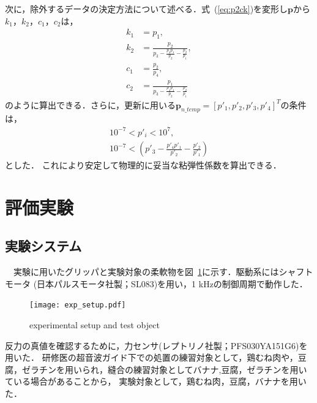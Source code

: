 \documentclass[a4paper]{jarticle}
\begin{document}
次に，除外するデータの決定方法について述べる．式~(\ref{eq:p2ck})を変形し$\mathbf{p}$から$k_1$，$k_2$，$c_1$，$c_2$は，
\begin{equation}
    \begin{aligned}
        k_1 &= p_1 ,\\
        k_2 &= \frac{p_2}{p_3 - \frac{p_4 p_1}{p_2} - \frac{p_2}{p_1}} ,\\
        c_1 &= \frac{p_2}{p_4},\\
        c_2 &= \frac{p_1}{p_3 - \frac{p_4 p_1}{p_2} - \frac{p_2}{p_1}} 
    \end{aligned}
\end{equation}
のように算出できる．さらに，更新に用いる$\mathbf{p}_{n\_temp}=[p'_1,p'_2,p'_3,p'_4]^{T}$の条件は，
\begin{equation}
    \begin{aligned}
        10^{-7} < {p}'_{i} < 10^{7} ,\\
        10^{-7} < \left( p'_3 - \frac{p'_4 p'_1}{p'_2} - \frac{p'_2}{p'_1} \right)
    \end{aligned}
\end{equation}
とした．
これにより安定して物理的に妥当な粘弾性係数を算出できる．
\section{評価実験}
\subsection{実験システム}
　実験に用いたグリッパと実験対象の柔軟物を図~\ref{fig:exp_setup}に示す．駆動系にはシャフトモータ (日本パルスモータ社製；SL083)を用い，1 kHzの制御周期で動作した．
\begin{figure}[tb]
    \centering
    \texttt{[image: exp\_setup.pdf]}
    \caption{experimental setup and test object}
    \label{fig:exp_setup}
\end{figure}
反力の真値を確認するために，力センサ(レプトリノ社製；PFS030YA151G6)を用いた．
研修医の超音波ガイド下での処置の練習対象として，鶏むね肉や，豆腐，ゼラチンを用いられ，縫合の練習対象としてバナナ,豆腐，ゼラチンを用いている場合があることから\cite{exp_ref1}\cite{exp_ref2}\cite{exp_ref3}，
実験対象として，鶏むね肉，豆腐，バナナを用いた．
\end{document}
